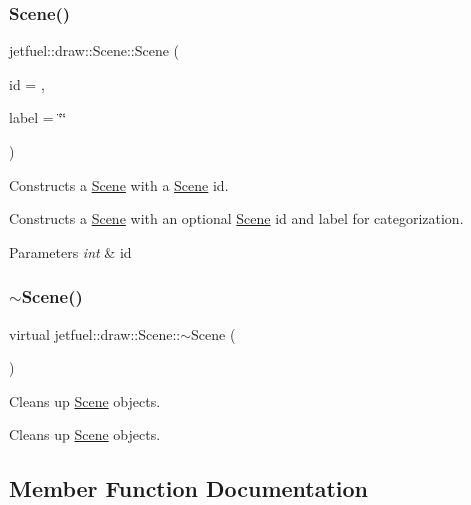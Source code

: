 \subsubsection{\texorpdfstring{Scene()}{Scene()}}
{\footnotesize\ttfamily jetfuel\+::draw\+::\+Scene\+::\+Scene (\begin{DoxyParamCaption}\item[{const int}]{id = {},  }\item[{const std\+::string}]{label = {\ttfamily \char`\"{}\char`\"{}} }\end{DoxyParamCaption})}



Constructs a \hyperlink{classjetfuel_1_1draw_1_1Scene}{Scene} with a \hyperlink{classjetfuel_1_1draw_1_1Scene}{Scene} id. 

Constructs a \hyperlink{classjetfuel_1_1draw_1_1Scene}{Scene} with an optional \hyperlink{classjetfuel_1_1draw_1_1Scene}{Scene} id and label for categorization.


\begin{DoxyParams}{Parameters}
{\em int} & id \\
\hline
\end{DoxyParams}
\mbox{\label{classjetfuel_1_1draw_1_1Scene_ac3e990c0deba1b5bb8d0552033a4ad81}} 
\subsubsection{\texorpdfstring{$\sim$\+Scene()}{~Scene()}}
{\footnotesize\ttfamily virtual jetfuel\+::draw\+::\+Scene\+::$\sim$\+Scene (\begin{DoxyParamCaption}{ }\end{DoxyParamCaption})\hspace{0.3cm}{\ttfamily [virtual]}}



Cleans up \hyperlink{classjetfuel_1_1draw_1_1Scene}{Scene} objects. 

Cleans up \hyperlink{classjetfuel_1_1draw_1_1Scene}{Scene} objects. 

\subsection{Member Function Documentation}
\mbox{\label{classjetfuel_1_1draw_1_1Scene_a4ab618141cf7e10c95cbe7b114688c1a}} 
